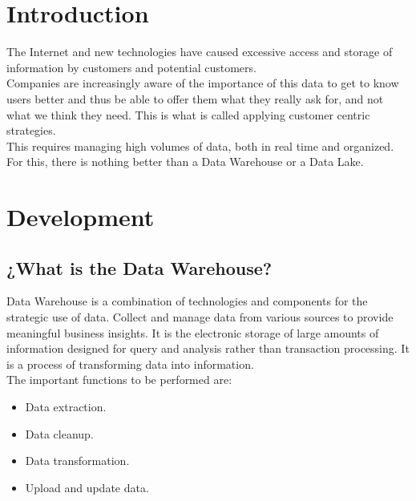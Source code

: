 \documentclass[twocolumn]{article}
\begin{document}

\section{Introduction}

\noindent The Internet and new technologies have caused excessive access and storage of information by customers and potential customers.\\[0.1in]
Companies are increasingly aware of the importance of this data to get to know users better and thus be able to offer them what they really ask for, and not what we think they need. This is what is called applying customer centric strategies.\\[0.1in]
This requires managing high volumes of data, both in real time and organized. For this, there is nothing better than a Data Warehouse or a Data Lake.
\section{Development}

\subsection{¿What is the Data Warehouse?}
\noindent Data Warehouse is a combination of technologies and components for the strategic use of data. Collect and manage data from various sources to provide meaningful business insights. It is the electronic storage of large amounts of information designed for query and analysis rather than transaction processing. It is a process of transforming data into information.\\[0.1in]
The important functions to be performed are:
\begin{itemize}
    \item Data extraction.
    \item Data cleanup.
    \item Data transformation.
    \item Upload and update data.
\end{itemize}
\end{document}
